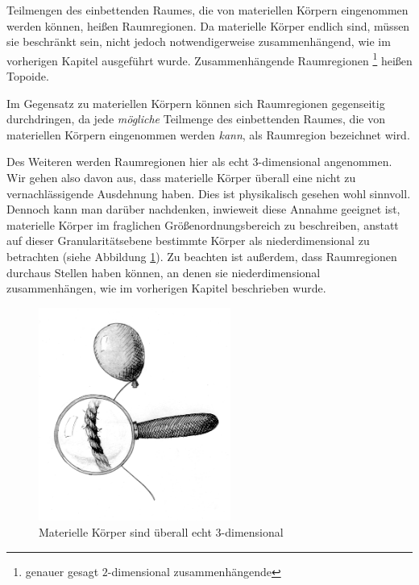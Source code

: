         Teilmengen des einbettenden Raumes, die von materiellen Körpern eingenommen werden können, heißen Raumregionen.
        Da materielle Körper endlich sind, müssen sie beschränkt sein, nicht jedoch notwendigerweise zusammenhängend, wie im vorherigen Kapitel ausgeführt wurde. 
        Zusammenhängende Raumregionen%
        \footnote{
            genauer gesagt $2$-dimensional zusammenhängende
        }
        heißen Topoide.
	
        Im Gegensatz zu materiellen Körpern können sich Raumregionen gegenseitig durchdringen,
        da jede \textit{mögliche} Teilmenge des einbettenden Raumes, die von materiellen Körpern eingenommen werden \textit{kann}, als Raumregion bezeichnet wird.
        
        Des Weiteren werden Raumregionen hier als echt $3$-dimensional angenommen. 
        Wir gehen also davon aus, dass materielle Körper überall eine nicht zu vernachlässigende Ausdehnung haben.
        Dies ist physikalisch gesehen wohl sinnvoll. 
        Dennoch kann man darüber nachdenken, inwieweit diese Annahme geeignet ist, materielle Körper im fraglichen Größenordnungsbereich zu beschreiben, anstatt auf dieser Granularitätsebene bestimmte Körper als niederdimensional zu betrachten (siehe Abbildung \ref{fig:echt-3-dim}).
        Zu beachten ist außerdem, dass Raumregionen durchaus Stellen haben können, an denen sie niederdimensional zusammenhängen, wie im vorherigen Kapitel beschrieben wurde.
	
        \begin{figure}[ht]
            \centering
            \includegraphics[height=7cm]{luise/echt-3-dim.png}
            \caption{Materielle Körper sind überall echt $3$-dimensional}
            \label{fig:echt-3-dim}
        \end{figure}


